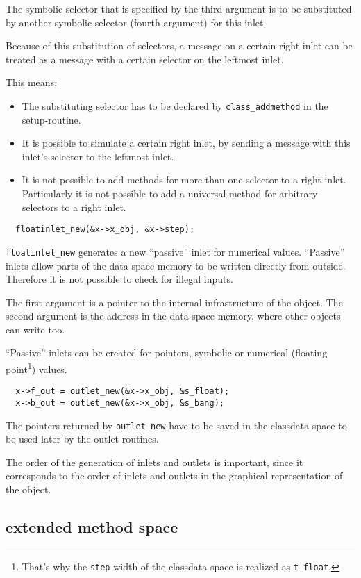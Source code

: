 \documentclass[12pt, a4paper,english,titlepage]{article}
\begin{document}
The symbolic selector that is specified by the third argument is to be
substituted by another symbolic selector (fourth argument) for this inlet.

Because of this substitution of selectors,
a message on a certain right inlet can be treated as a message with 
a certain selector on the leftmost inlet.

This means:
\begin{itemize}
\item The substituting selector has to be declared by \verb+class_addmethod+
in the setup-routine.
\item It is possible to simulate a certain right inlet, by sending a message with
this inlet's selector to the leftmost inlet.
\item It is not possible to add methods for more than one selector to a right inlet.
Particularly it is not possible to add a universal method for arbitrary selectors to 
a right inlet.
\end{itemize}

\begin{verbatim}
  floatinlet_new(&x->x_obj, &x->step);
\end{verbatim}
\verb+floatinlet_new+ generates a new ``passive'' inlet for numerical values.
``Passive'' inlets allow parts of the data space-memory to be written directly 
from outside.
Therefore it is not possible to check for illegal inputs.

The first argument is a pointer to the internal infrastructure of the object.
The second argument is the address in the data space-memory,
where other objects can write too.

``Passive'' inlets can be created for pointers, symbolic or
numerical (floating point\footnote{
That's why the {\tt step}-width of the class\/data space is realized as {\tt t\_float}.})
values.


\begin{verbatim}
  x->f_out = outlet_new(&x->x_obj, &s_float);
  x->b_out = outlet_new(&x->x_obj, &s_bang);
\end{verbatim}

The pointers returned by \verb+outlet_new+ have to be saved in the class\/data space
to be used later by the outlet-routines.

The order of the generation of inlets and outlets is important,
since it corresponds to the order of inlets and outlets in the
graphical representation of the object.

\subsection{extended method space}
\end{document}
